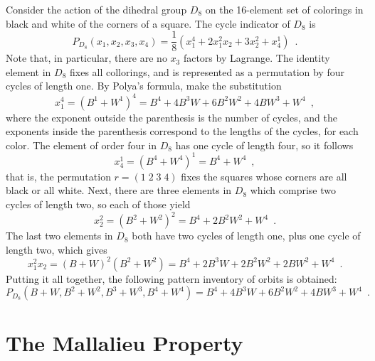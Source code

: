 \begin{example}
	\cite[249]{Tucker1974}
	Consider the action of the dihedral group $D_8$ on the 16-element set of colorings in
	black and white of the corners of a square. The cycle indicator of $D_8$ is
	\begin{equation}
		P_{D_8}(x_1, x_2, x_3, x_4) =
		\frac{1}{8}(x_1^4 + 2x_1^2x_2 + 3x_2^2 + x_4^1) \enspace.
	\end{equation}
	Note that, in particular, there are no $x_3$ factors by Lagrange. The identity element
	in $D_8$ fixes all collorings, and is represented as a permutation by four cycles
	of length one. By Polya's formula, make the substitution
	\begin{equation}
		x_1^4 = (B^1 + W^1)^4 = B^4 + 4 B^3 W + 6 B^2 W^2 + 4 B W^3 + W^4 \enspace,
	\end{equation}
	where the exponent outside the parenthesis is the number of cycles, and the exponents
	inside the parenthesis correspond to the lengths of the cycles, for each color.
	The element of order four in $D_8$ has one cycle of length four, so it follows
	\begin{equation}
		x_4^1 = (B^4 + W^4)^1 = B^4 + W^4 \enspace,
	\end{equation}
	that is, the permutation $r = (1 \; 2 \; 3 \; 4)$ fixes the squares whose corners are
	all black or all white. Next, there are three elements in $D_8$ which comprise
	two cycles of length two, so each of those yield
	\begin{equation}
		x_2^2 = (B^2 + W^2)^2 = B^4 + 2 B^2 W^2 + W^4 \enspace.
	\end{equation}
	The last two elements in $D_8$ both have two cycles of length one, plus one cycle
	of length two, which gives
	\begin{equation}
		x_1^2x_2 = (B + W)^2 (B^2 + W^2) =
		B^4 + 2 B^3 W + 2 B^2 W^2 + 2 B W^2 + W^4 \enspace.
	\end{equation}
	Putting it all together, the following pattern inventory of orbits is obtained:
	\begin{equation}
		P_{D_8}(B + W, B^2 + W^2, B^3 + W^3, B^4 + W^4) =
		B^4 + 4 B^3 W + 6 B^2 W^2 + 4 B W^3 + W^4 \enspace.
	\end{equation}
\end{example}

\chapter{The Mallalieu Property}
\label{mallalieu-section}

